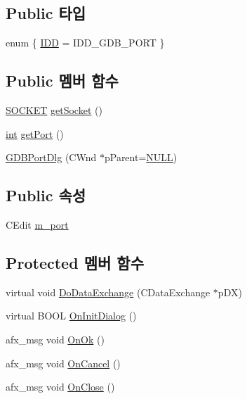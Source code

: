 \subsection*{Public 타입}
\begin{DoxyCompactItemize}
\item 
enum \{ \mbox{\hyperlink{class_g_d_b_port_dlg_a04b7310ce182cc037cf3e74852d61ebba59167ee2b7092de6e5cacd6ef77f3cff}{I\+DD}} = I\+D\+D\+\_\+\+G\+D\+B\+\_\+\+P\+O\+RT
 \}
\end{DoxyCompactItemize}
\subsection*{Public 멤버 함수}
\begin{DoxyCompactItemize}
\item 
\mbox{\hyperlink{remote_8cpp_aff55fe551a9992a54ec54621c524d0a4}{S\+O\+C\+K\+ET}} \mbox{\hyperlink{class_g_d_b_port_dlg_a6319081133e78827d9dfb6c287d88068}{get\+Socket}} ()
\item 
\mbox{\hyperlink{_util_8cpp_a0ef32aa8672df19503a49fab2d0c8071}{int}} \mbox{\hyperlink{class_g_d_b_port_dlg_aedb1de0b6ce4cf403b6be05f2a6d9668}{get\+Port}} ()
\item 
\mbox{\hyperlink{class_g_d_b_port_dlg_aaae63af104a2adb206c99bcb33e22794}{G\+D\+B\+Port\+Dlg}} (C\+Wnd $\ast$p\+Parent=\mbox{\hyperlink{_system_8h_a070d2ce7b6bb7e5c05602aa8c308d0c4}{N\+U\+LL}})
\end{DoxyCompactItemize}
\subsection*{Public 속성}
\begin{DoxyCompactItemize}
\item 
C\+Edit \mbox{\hyperlink{class_g_d_b_port_dlg_a243e7307371feed3fe058cbf822c3cb0}{m\+\_\+port}}
\end{DoxyCompactItemize}
\subsection*{Protected 멤버 함수}
\begin{DoxyCompactItemize}
\item 
virtual void \mbox{\hyperlink{class_g_d_b_port_dlg_a05547373a733d6038a8b1091e3f94d71}{Do\+Data\+Exchange}} (C\+Data\+Exchange $\ast$p\+DX)
\item 
virtual B\+O\+OL \mbox{\hyperlink{class_g_d_b_port_dlg_af7abe221ad56b1aedf9f3dad6e03a031}{On\+Init\+Dialog}} ()
\item 
afx\+\_\+msg void \mbox{\hyperlink{class_g_d_b_port_dlg_a1f6d1611b04e5e1803b4d2faf1a117f2}{On\+Ok}} ()
\item 
afx\+\_\+msg void \mbox{\hyperlink{class_g_d_b_port_dlg_aec825d9c81585a57a4951fe68940293d}{On\+Cancel}} ()
\item 
afx\+\_\+msg void \mbox{\hyperlink{class_g_d_b_port_dlg_a77f1b200ffbe8a3d0cc555baec9c36ce}{On\+Close}} ()
\end{DoxyCompactItemize}


